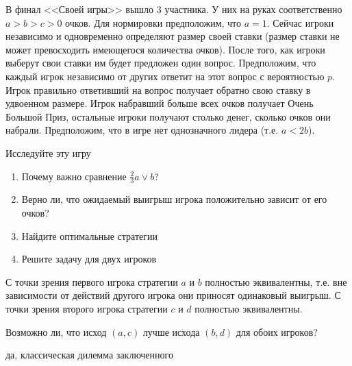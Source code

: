 \begin{problem}
\begin{source}
\cite{lones:dtc}
\end{source}
В финал <<Своей игры>> вышло 3 участника. У них на руках соответственно $a>b>c>0$ очков. Для нормировки предположим, что $a=1$. Сейчас игроки независимо и одновременно определяют размер своей ставки (размер ставки не может превосходить имеющегося количества очков). После того, как игроки выберут свои ставки им будет предложен один вопрос. Предположим, что каждый игрок независимо от других ответит на этот вопрос с вероятностью $p$. Игрок правильно ответивший на вопрос получает обратно свою ставку в удвоенном размере. Игрок набравший больше всех очков получает Очень Большой Приз, остальные игроки получают столько денег, сколько очков они набрали. Предположим, что в игре нет однозначного лидера (т.е. $a<2b$). \par
Исследуйте эту игру \par
\begin{enumerate}
\item  Почему важно сравнение $\frac{2}{3}a \vee b$? \par
\item Верно ли, что ожидаемый выигрыш игрока положительно зависит от его очков? \par
\item  Найдите оптимальные стратегии \par
\item Решите задачу для двух игроков \par
\end{enumerate}



\begin{sol}

\end{sol}
\end{problem}



\begin{problem}
С точки зрения первого игрока стратегии $a$ и $b$ полностью
эквивалентны, т.е. вне зависимости от действий другого игрока они
приносят одинаковый выигрыш. С точки зрения второго игрока
стратегии $c$ и $d$ полностью эквивалентны. \par
Возможно ли, что исход $(a,c)$ лучше исхода $(b,d)$ для обоих
игроков?



\begin{sol}
да, классическая дилемма заключенного
\end{sol}
\end{problem}



